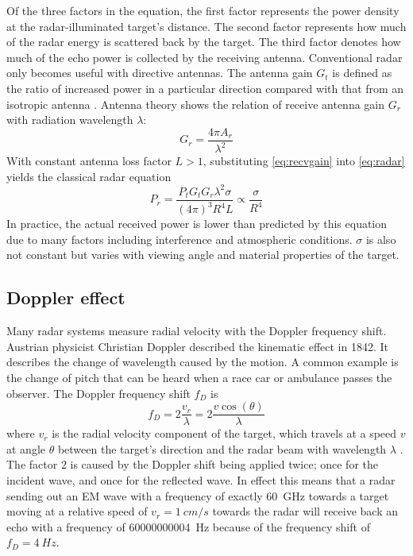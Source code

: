 Of the three factors in the equation, the first
factor represents the power density at the radar-illuminated target's
distance. The second factor represents how much of the radar energy is
scattered back by the target. The third factor denotes how much
of the echo power is collected by the receiving antenna.
\cite{Skolnik2008} Conventional radar only becomes useful with directive
antennas. The antenna gain \(G_t\) is defined as the ratio of increased
power in a particular direction compared with that from an isotropic
antenna \cite{Adams2012}. Antenna theory shows \cite{Balanis2015} the
relation of receive antenna gain \(G_r\) with radiation wavelength
\(\lambda\):
\begin{equation} \label{eq:recvgain}
    G_r = \frac{4\pi A_r}{\lambda^2}    
\end{equation}
With constant antenna loss factor \(L>1\), substituting \cref{eq:recvgain} into \cref{eq:radar}
yields the classical radar equation
\begin{equation} \label{eq:radarclassical}
    P_r =
    \frac{P_t G_t G_r \lambda^2 \sigma}{(4\pi)^3R^4L}
    \propto \frac{\sigma}{R^4}
\end{equation}
In practice, the actual received power is lower than predicted by
this equation due to many factors including interference and
atmospheric conditions. \(\sigma\) is also not constant but varies with
viewing angle and material properties of the target. \cite{Adams2012}

\subsection{Doppler effect}\label{doppler-effect}

Many radar systems measure radial velocity with the Doppler frequency
shift. Austrian physicist Christian Doppler described the kinematic
effect in 1842. It describes the change of wavelength caused by the
motion. A common example is the change of pitch that can be heard when a
race car or ambulance passes the observer. The Doppler frequency shift
\(f_D\) is
\begin{equation} \label{eq:doppler}
    f_D = 2 \frac{v_r}{\lambda} = 2 \frac{v \cos ( \theta )}{\lambda}
\end{equation}
where \(v_r\) is the radial velocity component of the target, which
travels at a speed \(v\) at angle \(\theta\) between the target's
direction and the radar beam with wavelength \(\lambda\)
\cite{Skolnik2008}. The factor \(2\) is caused by the Doppler shift
being applied twice; once for the incident wave, and once for the
reflected wave. In effect this means that a radar sending out an EM wave
with a frequency of exactly \SI{60}{GHz} towards a target moving at a
relative speed of \(v_r = \SI[per-mode=symbol]{1}{cm\per s}\) towards the radar will receive
back an echo with a frequency of \SI{60000000004}{Hz} because of the
frequency shift of \(f_D = \SI{4}{Hz}\).

